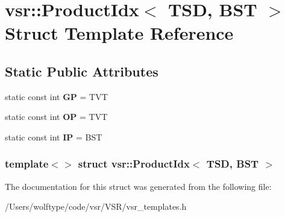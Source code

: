\hypertarget{structvsr_1_1_product_idx_3_01_t_s_d_00_01_b_s_t_01_4}{\section{vsr\-:\-:Product\-Idx$<$ T\-S\-D, B\-S\-T $>$ Struct Template Reference}
\label{structvsr_1_1_product_idx_3_01_t_s_d_00_01_b_s_t_01_4}
}
\subsection*{Static Public Attributes}
\begin{DoxyCompactItemize}
\item 
\hypertarget{structvsr_1_1_product_idx_3_01_t_s_d_00_01_b_s_t_01_4_a78a09f1f80a6a424858be4800e2712a5}{static const int {\bfseries G\-P} = T\-V\-T}\label{structvsr_1_1_product_idx_3_01_t_s_d_00_01_b_s_t_01_4_a78a09f1f80a6a424858be4800e2712a5}

\item 
\hypertarget{structvsr_1_1_product_idx_3_01_t_s_d_00_01_b_s_t_01_4_accc066271f562623f54732291c3a4e07}{static const int {\bfseries O\-P} = T\-V\-T}\label{structvsr_1_1_product_idx_3_01_t_s_d_00_01_b_s_t_01_4_accc066271f562623f54732291c3a4e07}

\item 
\hypertarget{structvsr_1_1_product_idx_3_01_t_s_d_00_01_b_s_t_01_4_a9c4968015ead8557fe9e1faa7a77c218}{static const int {\bfseries I\-P} = B\-S\-T}\label{structvsr_1_1_product_idx_3_01_t_s_d_00_01_b_s_t_01_4_a9c4968015ead8557fe9e1faa7a77c218}

\end{DoxyCompactItemize}
\subsubsection*{template$<$$>$ struct vsr\-::\-Product\-Idx$<$ T\-S\-D, B\-S\-T $>$}



The documentation for this struct was generated from the following file\-:\begin{DoxyCompactItemize}
\item 
/\-Users/wolftype/code/vsr/\-V\-S\-R/vsr\-\_\-templates.\-h\end{DoxyCompactItemize}
